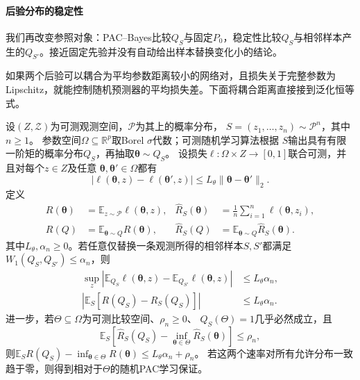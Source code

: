 \paragraph{后验分布的稳定性}

我们再改变参照对象：PAC--Bayes比较$Q_S$与固定$P_0$，稳定性比较$Q_S$与相邻样本产生的$Q_{S'}$。接近固定先验并没有自动给出样本替换变化小的结论。

如果两个后验可以耦合为平均参数距离较小的网络对，且损失关于完整参数为Lipschitz，就能控制随机预测器的平均损失差。下面将耦合距离直接接到泛化恒等式。

\begin{theorem}[参数分布稳定性与期望泛化差]
\label{thm:distribution-stability-generalization}
设$(Z,\mathcal Z)$为可测观测空间，$\mathcal P$为其上的概率分布，
$S=(z_1,\ldots,z_n)\sim\mathcal P^n$，其中$n\geq1$。
参数空间$\Omega\subseteq\mathbb R^p$取Borel $\sigma$代数；可测随机学习算法根据
$S$输出具有有限一阶矩的概率分布$Q_S$，再抽取$\bm\theta\sim Q_S$。
设损失$\ell:\Omega\times Z\to[0,1]$联合可测，并且对每个$z\in Z$及任意
$\bm\theta,\bm\theta'\in\Omega$都有
\[
 |\ell(\bm\theta,z)-\ell(\bm\theta',z)|
 \leq L_\theta\|\bm\theta-\bm\theta'\|_2.
\]
定义
\[
 \begin{aligned}
 R(\bm\theta)&=\mathbb E_{z\sim\mathcal P}\ell(\bm\theta,z),&
 \hat R_S(\bm\theta)&=\frac1n\sum_{i=1}^n\ell(\bm\theta,z_i),\\
 R(Q)&=\mathbb E_{\bm\theta\sim Q}R(\bm\theta),&
 \hat R_S(Q)&=\mathbb E_{\bm\theta\sim Q}\hat R_S(\bm\theta).
 \end{aligned}
\]
其中$L_\theta,\alpha_n\geq0$。若任意仅替换一条观测所得的相邻样本$S,S'$都满足
$W_1(Q_S,Q_{S'})\leq\alpha_n$，则
\[
 \begin{aligned}
 \sup_z\left|\mathbb E_{Q_S}\ell(\bm\theta,z)
              -\mathbb E_{Q_{S'}}\ell(\bm\theta,z)\right|
 &\leq L_\theta\alpha_n,\\
 \left|\mathbb E_S[R(Q_S)-\hat R_S(Q_S)]\right|
 &\leq L_\theta\alpha_n.
 \end{aligned}
\]
进一步，若$\Theta\subseteq\Omega$为可测比较空间、$\rho_n\geq0$、
$Q_S(\Theta)=1$几乎必然成立，且
\[
 \mathbb E_S\left[\hat R_S(Q_S)-\inf_{\bm\theta\in\Theta}
                           \hat R_S(\bm\theta)\right]\leq\rho_n,
\]
则$\mathbb E_S R(Q_S)-\inf_{\bm\theta\in\Theta}R(\bm\theta)
\leq L_\theta\alpha_n+\rho_n$。
若这两个速率对所有允许分布一致趋于零，则得到相对于$\Theta$的随机PAC学习保证。
\end{theorem}
